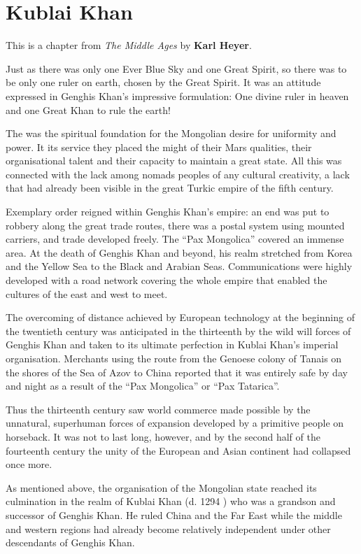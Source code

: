 \section{Kublai Khan}

\begin{quotex}
This is a chapter from \textit{The Middle Ages} by \textbf{Karl Heyer}.
\end{quotex}

Just as there was only one Ever Blue Sky and one Great Spirit, so there was to be only one ruler on earth, chosen by the Great Spirit. It was an attitude expressed in Genghis Khan's impressive formulation: One divine ruler in heaven and one Great Khan to rule the earth!

The was the spiritual foundation for the Mongolian desire for uniformity and power. It its service they placed the might of their Mars qualities, their organisational talent and their capacity to maintain a great state. All this was connected with the lack among nomads peoples of any cultural creativity, a lack that had already been visible in the great Turkic empire of the fifth century.

Exemplary order reigned within Genghis Khan's empire: an end was put to robbery along the great trade routes, there was a postal system using mounted carriers, and trade developed freely. The ``Pax Mongolica'' covered an immense area. At the death of Genghis Khan and beyond, his realm stretched from Korea and the Yellow Sea to the Black and Arabian Seas. Communications were highly developed with a road network covering the whole empire that enabled the cultures of the east and west to meet.

The overcoming of distance achieved by European technology at the beginning of the twentieth century was anticipated in the thirteenth by the wild will forces of Genghis Khan and taken to its ultimate perfection in Kublai Khan's imperial organisation. Merchants using the route from the Genoese colony of Tanais on the shores of the Sea of Azov to China reported that it was entirely safe by day and night as a result of the ``Pax Mongolica'' or ``Pax Tatarica''.

Thus the thirteenth century saw world commerce made possible by the unnatural, superhuman forces of expansion developed by a primitive people on horseback. It was not to last long, however, and by the second half of the fourteenth century the unity of the European and Asian continent had collapsed once more.

As mentioned above, the organisation of the Mongolian state reached its culmination in the realm of Kublai Khan (d. 1294 ) who was a grandson and successor of Genghis Khan. He ruled China and the Far East while the middle and western regions had already become relatively independent under other descendants of Genghis Khan.

